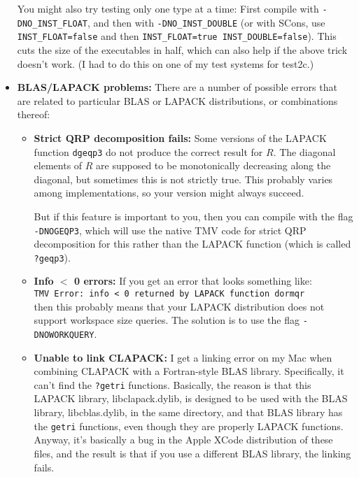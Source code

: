 \documentclass[twoside,letterpaper,11pt]{article}
\renewcommand{\tt}[1]{{\lstinline {#1}}}
\begin{document}
\begin{itemize}
You might also try testing only one type at a time: First compile with \texttt{-DNO\_INST\_FLOAT},
and then with \texttt{-DNO\_INST\_DOUBLE} (or with SCons, use \texttt{INST\_FLOAT=false}
and then \texttt{INST\_FLOAT=true INST\_DOUBLE=false}).  This cuts the size of the executables
in half, which can also help if the above trick doesn't work.  (I had to do this on one 
of my test systems for test2c.)


\item{\bf BLAS/LAPACK problems:}
There are a number of possible errors that are related to particular BLAS or LAPACK
distributions, or combinations thereof:
\begin{itemize}
\item{\bf Strict QRP decomposition fails:}
Some versions of the LAPACK function \tt{dgeqp3} do not produce the correct
result for $R$.  The diagonal elements of $R$ are supposed to be monotonically decreasing
along the diagonal, but sometimes this is not strictly true.  This probably varies among
implementations, so your version might always succeed.

But if this feature is important to you, then you can compile with the flag \texttt{-DNOGEQP3},
which will use the native TMV code for strict QRP decomposition for this 
rather than the LAPACK function (which is called \tt{?geqp3}).

\item{\bf Info $<$ 0 errors:}
If you get an error that looks something like:\\
\texttt{TMV Error: info < 0 returned by LAPACK function dormqr}\\
then this probably means that your LAPACK distribution does not support
workspace size queries.  The solution is to use the flag \texttt{-DNOWORKQUERY}.

\item {\bf Unable to link CLAPACK:}
I get a linking error on my Mac when combining CLAPACK with a Fortran-style BLAS library.
Specifically, it can't find the \texttt{?getri} functions.   Basically, the reason is that
this LAPACK library, libclapack.dylib, is designed to be used with the BLAS
library, libcblas.dylib, in the same directory, and that BLAS library has the \texttt{getri}
functions, even though they are properly LAPACK functions.
Anyway, it's basically a bug in the Apple XCode distribution of these files,
and the result is that if you use a different BLAS library, the linking fails.


\end{itemize}
\end{itemize}
\end{document}
